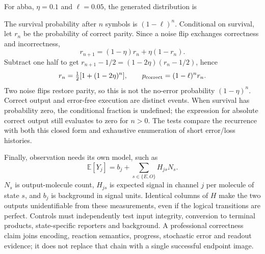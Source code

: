 For abba, $\eta=0.1$ and $\ell=0.05$, the generated distribution is
\begin{center}\end{center}
The survival probability after $n$ symbols is $(1-\ell)^n$. Conditional on
survival, let $r_n$ be the probability of correct parity. Since a noise flip
exchanges correctness and incorrectness,
\[
 r_{n+1}=(1-\eta)r_n+\eta(1-r_n).
\]
Subtract one half to get
$r_{n+1}-1/2=(1-2\eta)(r_n-1/2)$, hence
\begin{equation}
 r_n=\tfrac12[1+(1-2\eta)^n],\qquad
 p_{\rm correct}=(1-\ell)^n r_n.
\end{equation}
Two noise flips restore parity, so this is not the no-error probability
$(1-\eta)^n$. Correct output and error-free execution are distinct events.
When survival has probability zero, the conditional fraction is undefined;
the expression for absolute correct output still evaluates to zero for $n>0$.
The tests compare the recurrence with both this closed form and exhaustive
enumeration of short error/loss histories.

Finally, observation needs its own model, such as
\begin{equation}
 \mathbb E[Y_j]=b_j+\sum_{s\in\{E,O\}}H_{js}N_s.
\end{equation}
$N_s$ is output-molecule count, $H_{js}$ is expected signal in channel $j$
per molecule of state $s$, and $b_j$ is background in signal units. Identical
columns of $H$ make the two outputs unidentifiable from these measurements,
even if the logical transitions are perfect. Controls must independently
test input integrity, conversion to terminal products, state-specific
reporters and background. A professional correctness claim joins encoding,
reaction semantics, progress, stochastic error and readout evidence; it does
not replace that chain with a single successful endpoint image.
